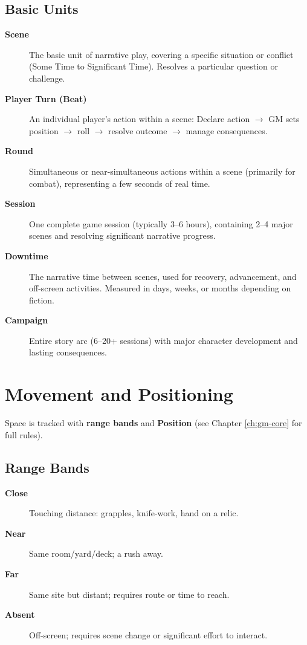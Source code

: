 \subsection*{Basic Units}
\label{sec:time-units}
\begin{description}
\item[\textbf{Scene}]  The basic unit of narrative play, covering a specific situation or conflict (Some Time to Significant Time). Resolves a particular question or challenge.
\item[\textbf{Player Turn (Beat)}]  An individual player's action within a scene: Declare action $\rightarrow$ GM sets position $\rightarrow$ roll $\rightarrow$ resolve outcome $\rightarrow$ manage consequences.
\item[\textbf{Round}]  Simultaneous or near-simultaneous actions within a scene (primarily for combat), representing a few seconds of real time.
\item[\textbf{Session}]  One complete game session (typically 3--6 hours), containing 2--4 major scenes and resolving significant narrative progress.
\item[\textbf{Downtime}]  The narrative time between scenes, used for recovery, advancement, and off-screen activities. Measured in days, weeks, or months depending on fiction.
\item[\textbf{Campaign}]  Entire story arc (6--20+ sessions) with major character development and lasting consequences.
\end{description}

\section{Movement and Positioning}
\label{sec:movement-positioning}

Space is tracked with \textbf{range bands} and \textbf{Position} (see Chapter \ref{ch:gm-core} for full rules).

\subsection*{Range Bands}
\begin{description}
\item[\textbf{Close}]  Touching distance: grapples, knife-work, hand on a relic.
\item[\textbf{Near}]  Same room/yard/deck; a rush away.
\item[\textbf{Far}]  Same site but distant; requires route or time to reach.
\item[\textbf{Absent}]  Off-screen; requires scene change or significant effort to interact.
\end{description}

